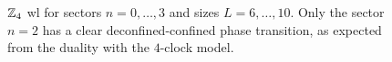 \begin{figure}[t]
    \centering
    
    \vspace*{-10pt}
    \caption[\ac{wl}s for the $\Z_4$ ladder \ac{lgt}]{$\Z_4$ \ac{wl} for sectors $n=0, \dots, 3$ and sizes $L=6, \dots, 10$.
        Only the sector $n = 2$ has a clear deconfined-confined phase transition, as expected from the duality with the $4$-clock model.
    }
    \label{fig:z4_wilson}
\end{figure}


